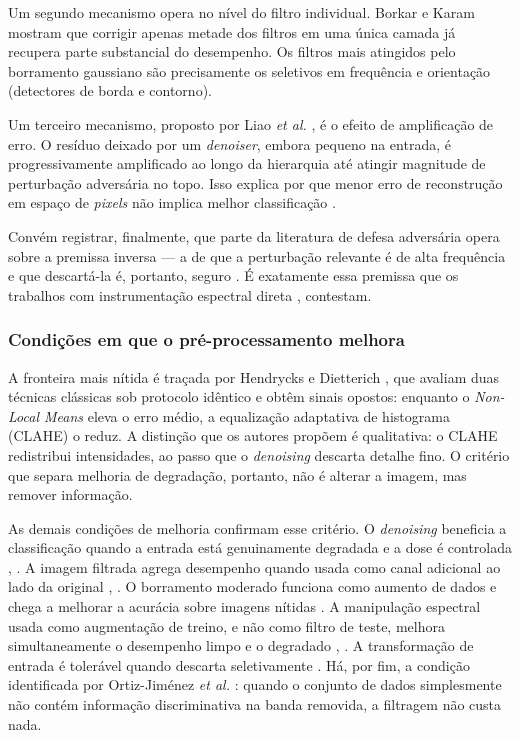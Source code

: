 \documentclass[conference]{IEEEtran}
\begin{document}
Um segundo mecanismo opera no nível do filtro individual. Borkar e Karam
\cite{b25} mostram que corrigir apenas metade dos filtros em uma única 
camada já recupera parte substancial do desempenho. Os filtros mais atingidos 
pelo borramento gaussiano são precisamente os seletivos em frequência e orientação (detectores de borda e contorno).

Um terceiro mecanismo, proposto por Liao \textit{et al.} \cite{b7}, é o efeito
de amplificação de erro. O resíduo deixado por um \textit{denoiser}, 
embora pequeno na entrada, é progressivamente amplificado ao longo da 
hierarquia até atingir magnitude de perturbação adversária no topo. 
Isso explica por que menor erro de reconstrução em espaço de \textit{pixels} não implica 
melhor classificação \cite{b26}. 

Convém registrar, finalmente, que parte da literatura de defesa adversária
opera sobre a premissa inversa --- a de que a perturbação relevante é de alta
frequência e que descartá-la é, portanto, seguro \cite{b27}. É exatamente essa
premissa que os trabalhos com instrumentação espectral direta \cite{b18},
\cite{b22} contestam.

\subsubsection{Condições em que o pré-processamento melhora}

A fronteira mais nítida é traçada por Hendrycks e Dietterich \cite{b6}, que
avaliam duas técnicas clássicas sob protocolo idêntico e obtêm sinais opostos:
enquanto o \textit{Non-Local Means} eleva o erro médio, a equalização adaptativa 
de histograma (CLAHE) o reduz. A distinção que os
autores propõem é qualitativa: o CLAHE redistribui intensidades,
ao passo que o \textit{denoising} descarta detalhe fino. O critério que separa
melhoria de degradação, portanto, não é alterar a imagem, mas remover
informação.

As demais condições de melhoria confirmam esse critério. O \textit{denoising} beneficia 
a classificação quando a entrada está genuinamente degradada e a dose é 
controlada \cite{b26}, \cite{b8}. A imagem filtrada agrega desempenho quando usada como 
canal adicional ao lado da original \cite{b9}, \cite{b16}. O borramento
moderado funciona como aumento de dados e chega a melhorar a acurácia sobre
imagens nítidas \cite{b4}. A manipulação espectral usada como augmentação de treino, e 
não como filtro de teste, melhora simultaneamente o desempenho limpo e o degradado 
\cite{b28}, \cite{b29}. A transformação de entrada é tolerável quando descarta
seletivamente \cite{b11}. Há, por fim, a condição identificada por Ortiz-Jiménez 
\textit{et al.} \cite{b23}: quando o conjunto de dados simplesmente não contém 
informação discriminativa na banda removida, a filtragem não custa nada.
\end{document}
